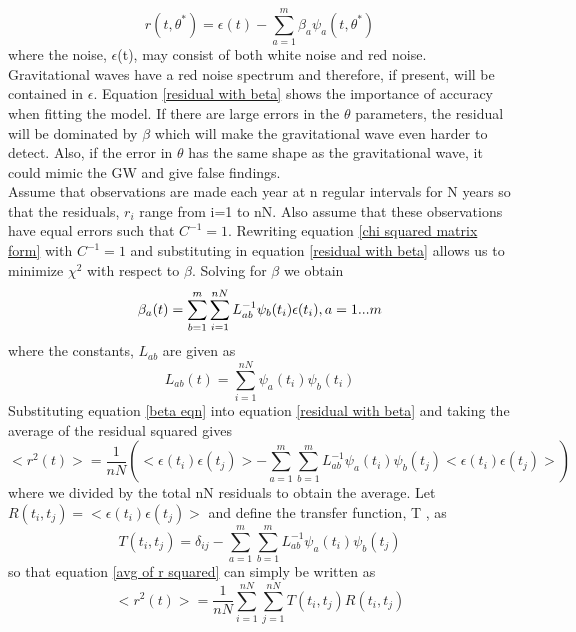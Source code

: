 \documentclass[12pt]{article}
\begin{document}
	\begin{equation}\label{residual with beta}
	r(t,\theta^*)=\epsilon(t)-\sum_{a=1}^{m}\beta_a \psi_a(t,\theta^*)%
	\end{equation}
	where the noise, $\epsilon$(t), may consist of both white noise and red noise. Gravitational waves have a red noise spectrum and therefore, if present, will  be contained in $\epsilon$.
	Equation \ref{residual with beta} shows the importance of accuracy when fitting the model. If there are large errors in the $\theta$ parameters, the residual will be dominated by $\beta$ which will make the gravitational wave even harder to detect. Also, if the error in $\theta$ has the same shape as the gravitational wave, it could mimic the GW and give false findings. \\
	Assume that observations are made each year at n regular intervals for N years so that the residuals, $r_i$ range from i=1 to nN. Also assume that these observations have equal errors \cite{kopeikin1999millisecond} such that  $C^{-1}=1$. Rewriting equation \ref{chi squared matrix form} with  $C^{-1}=1$ and substituting in equation \ref{residual with beta} allows us to minimize $\chi^2$ with respect to $\beta$. Solving for $\beta$ we obtain 
	\begin{equation}\label{beta eqn}
	\beta_a(t)=\sum_{b=1}^{m}\sum_{i=1}^{nN}L_{ab}^{-1}\psi_b(t_i)\epsilon(t_i),\space	 a=1...m
	\end{equation}
	where the constants, $L_{ab}$ are given as
	\begin{equation}\label{Lab constants}
	L_{ab}(t)=\sum_{i=1}^{nN}\psi_a(t_i)\psi_b(t_i)
	\end{equation}
	Substituting equation \ref{beta eqn} into equation \ref{residual with beta} and taking the average  of the residual squared gives
	\begin{equation}\label{avg of r squared}
	<r^{2}(t)>=\frac{1}{nN}(<\epsilon(t_i)\epsilon(t_j)>-\sum_{a=1}^{m}\sum_{b=1}^{m}L_{ab}^{-1}\psi_a(t_i)\psi_b(t_j)<\epsilon(t_i)\epsilon(t_j)>)
	\end{equation}
	where we divided by the total nN residuals to obtain the average. Let $R(t_i,t_j)=<\epsilon(t_i)\epsilon(t_j)>$ and define the transfer function, T \cite{blandford1976arrival}, as 
	\begin{equation}\label{transfer function}
	T(t_i,t_j)=\delta_{ij}-\sum_{a=1}^{m}\sum_{b=1}^{m}L_{ab}^{-1}\psi_a(t_i)\psi_b(t_j)
	\end{equation}
	so that equation \ref{avg of r squared} can simply be written as
	\begin{equation}\label{new avg of r squared}
	<r^{2}(t)>=\frac{1}{nN}\sum_{i=1}^{nN}\sum_{j=1}^{nN}T(t_i,t_j)R(t_i,t_j)
	\end{equation}
	
\end{document}
